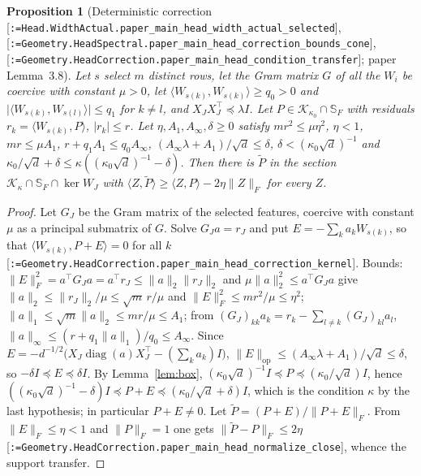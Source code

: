 \documentclass[11pt]{article}
\makeatletter
\newcommand{\formal@break}[1]{\@tfor\formal@tok:=#1\do{%
  \formal@tok
  \expandafter\ifx\formal@tok.\allowbreak\else
  \expandafter\ifx\formal@tok\_\allowbreak\fi\fi}}
\DeclareRobustCommand{\formal}[1]{\textnormal{[\texttt{\small\formal@break{#1}}]}}
\newcommand{\ip}[2]{\langle #1, #2\rangle}
\newcommand{\norm}[1]{\lVert #1\rVert}
\newcommand{\abs}[1]{\lvert #1\rvert}
\newcommand{\op}{\mathrm{op}}
\newcommand{\Fro}{F}
\newcommand{\sqd}{\sqrt{d}}
\newcommand{\Id}{I}
\newcommand{\cone}{\mathcal{K}}
\newcommand{\diag}{\operatorname{diag}}
\theoremstyle{plain}
\newtheorem{proposition}[theorem]{Proposition}
\theoremstyle{definition}
\makeatother
\begin{document}
\begin{proposition}[Deterministic correction \formal{Head.WidthActual.paper\_main\_head\_width\_actual\_selected}, \formal{Geometry.HeadSpectral.paper\_main\_head\_correction\_bounds\_cone}, \formal{Geometry.HeadCorrection.paper\_main\_head\_condition\_transfer}; paper Lemma~3.8]\label{prop:correction}
Let $s$ select $m$ distinct rows, let the Gram matrix $G$ of all the $W_i$
be coercive with constant $\mu > 0$, let $\ip{W_{s(k)}}{W_{s(k)}} \ge q_0 > 0$
and $\abs{\ip{W_{s(k)}}{W_{s(l)}}} \le q_1$ for $k \ne l$, and
$X_JX_J^{\top} \preceq \lambda\Id$. Let $P \in \cone_{\kappa_0}\cap\mathbb{S}_\Fro$
with residuals $r_k = \ip{W_{s(k)}}{P}$, $\abs{r_k} \le r$. Let
$\eta, A_1, A_\infty, \delta \ge 0$ satisfy $mr^2 \le \mu\eta^2$, $\eta < 1$,
$mr \le \mu A_1$, $r + q_1A_1 \le q_0A_\infty$, $(A_\infty\lambda + A_1)/\sqd \le \delta$,
$\delta < (\kappa_0\sqd)^{-1}$ and $\kappa_0/\sqd + \delta \le \kappa((\kappa_0\sqd)^{-1} - \delta)$.
Then there is $\tilde P$ in the section $\cone_\kappa\cap\mathbb{S}_\Fro\cap\ker W_J$
with $\ip{Z}{\tilde P} \ge \ip{Z}{P} - 2\eta\norm{Z}_\Fro$ for every $Z$.
\end{proposition}

\begin{proof}
Let $G_J$ be the Gram matrix of the selected features, coercive with
constant $\mu$ as a principal submatrix of $G$. Solve $G_Ja = r_J$ and put
$E = -\sum_ka_kW_{s(k)}$, so that $\ip{W_{s(k)}}{P + E} = 0$ for all $k$
\formal{Geometry.HeadCorrection.paper\_main\_head\_correction\_kernel}.
Bounds: $\norm{E}_\Fro^2 = a^{\top}G_Ja = a^{\top}r_J \le \norm{a}_2\norm{r_J}_2$
and $\mu\norm{a}_2^2 \le a^{\top}G_Ja$ give $\norm{a}_2 \le \norm{r_J}_2/\mu \le \sqrt m\,r/\mu$
and $\norm{E}_\Fro^2 \le mr^2/\mu \le \eta^2$; $\norm{a}_1 \le \sqrt m\norm{a}_2 \le mr/\mu \le A_1$;
from $(G_J)_{kk}a_k = r_k - \sum_{l\ne k}(G_J)_{kl}a_l$,
$\norm{a}_\infty \le (r + q_1\norm{a}_1)/q_0 \le A_\infty$. Since
$E = -d^{-1/2}\bigl(X_J\diag(a)X_J^{\top} - (\sum_ka_k)\Id\bigr)$,
$\norm{E}_\op \le (A_\infty\lambda + A_1)/\sqd \le \delta$, so
$-\delta\Id \preceq E \preceq \delta\Id$. By Lemma~\ref{lem:box},
$(\kappa_0\sqd)^{-1}\Id \preceq P \preceq (\kappa_0/\sqd)\Id$, hence
$((\kappa_0\sqd)^{-1} - \delta)\Id \preceq P + E \preceq (\kappa_0/\sqd + \delta)\Id$,
which is the condition $\kappa$ by the last hypothesis; in particular
$P + E \ne 0$. Let $\tilde P = (P + E)/\norm{P + E}_\Fro$. From
$\norm{E}_\Fro \le \eta < 1$ and $\norm{P}_\Fro = 1$ one gets
$\norm{\tilde P - P}_\Fro \le 2\eta$ \formal{Geometry.HeadCorrection.paper\_main\_head\_normalize\_close},
whence the support transfer.
\end{proof}
\end{document}
